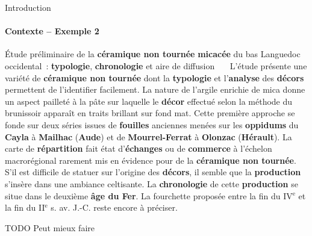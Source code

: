 \begin{frame}{Introduction}\framesubtitle{Contexte -- Exemple 2}
  \begin{exampleblock}{\small
    Étude préliminaire de la \textbf{\normalsize céramique non tournée}
    \textbf{\normalsize micacée} du bas Languedoc occidental~:
    \textbf{\normalsize typologie}, \textbf{\normalsize chronologie} et aire de
    diffusion
  }\justifying\small
    ~~~L'étude présente une variété de \textbf{\normalsize céramique non tournée}
    dont la \textbf{\normalsize typologie} et l'\textbf{\normalsize analyse} des
    \textbf{\normalsize décors} permettent de l'identifier facilement. La nature
    de l'argile enrichie de mica donne un aspect pailleté à la pâte sur laquelle
    le \textbf{\normalsize décor} effectué selon la méthode du brunissoir
    apparaît en traits brillant sur fond mat. Cette première approche se fonde
    sur deux séries issues de \textbf{\normalsize fouilles} anciennes menées sur
    les \textbf{\normalsize oppidums} du \textbf{\normalsize Cayla} à
    \textbf{\normalsize Mailhac} (\textbf{\normalsize Aude}) et de
    \textbf{\normalsize Mourrel-Ferrat} à \textbf{\normalsize Olonzac}
    (\textbf{\normalsize Hérault}). La carte de \textbf{\normalsize répartition}
    fait état d'\textbf{\normalsize échanges} ou de \textbf{\normalsize commerce}
    à l'échelon macrorégional rarement mis en évidence pour de la
    \textbf{\normalsize céramique non tournée}. S'il est difficile de statuer
    sur l'origine des \textbf{\normalsize décors}, il semble que la
    \textbf{\normalsize production} s'insère dans une ambiance celtisante. La
    \textbf{\normalsize chronologie} de cette \textbf{\normalsize production} se
    situe dans le deuxième \textbf{\normalsize âge du Fer}. La fourchette
    proposée entre la fin du IV$^\text{e}$ et la fin du II$^\text{e}$ s. av.
    J.-C. reste encore à préciser.
  \end{exampleblock}

  \begin{alertblock}{TODO}
    Peut mieux faire
  \end{alertblock}
\end{frame}

